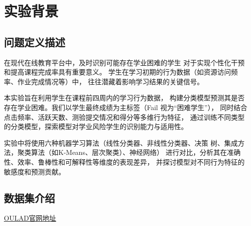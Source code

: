 \documentclass{SYSUReport}
\date{\today}
\begin{document}
\cover
\thispagestyle{empty} %
\clearpage

%
%


\setcounter{page}{1}
\tableofcontents
\clearpage

\setcounter{page}{1}


\section{实验背景}


\subsection{问题定义描述}

在现代在线教育平台中，及时识别可能存在学业困难的学生
对于实现个性化干预和提高课程完成率具有重要意义。
学生在学习初期的行为数据（如资源访问频率、作业完成情况等）中，
往往潜藏着影响学习结果的关键信号。

本实验旨在利用学生在课程前四周内的学习行为数据，
构建分类模型预测其是否存在学业困难。我们以学生最终成绩为主标签（Fail 视为“困难学生”），
同时结合点击频率、活跃天数、测验提交情况和得分等多维行为特征，
通过训练不同类型的分类模型，探索模型对学业风险学生的识别能力与适用性。

实验中将使用六种机器学习算法（线性分类器、非线性分类器、决策
树、集成方法，聚类算法（如K-Means、层次聚类）、神经网络）
进行对比，分析其在准确性、效率、鲁棒性和可解释性等维度的表现差异，
并探讨模型对不同行为特征的敏感度和预测贡献。

\subsection{数据集介绍}
\href{https://analyse.kmi.open.ac.uk/#open-dataset}{OULAD官网地址}
\end{document}
